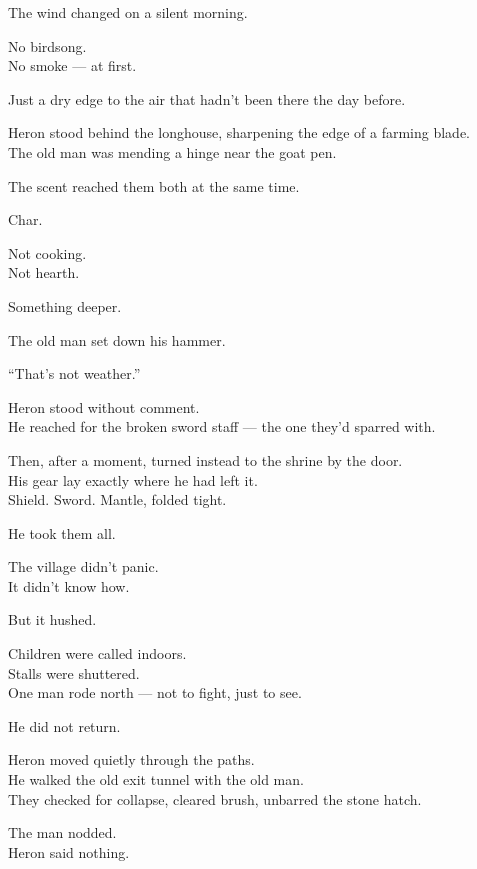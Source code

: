 \documentclass[12pt]{article}
\begin{document}
The wind changed on a silent morning.

No birdsong.\\
No smoke — at first.

Just a dry edge to the air that hadn’t been there the day before.

Heron stood behind the longhouse, sharpening the edge of a farming blade.\\
The old man was mending a hinge near the goat pen.

The scent reached them both at the same time.

Char.

Not cooking.\\
Not hearth.

Something deeper.

\vspace{1em}

The old man set down his hammer.

“That’s not weather.”

Heron stood without comment.\\
He reached for the broken sword staff — the one they’d sparred with.

Then, after a moment, turned instead to the shrine by the door.\\
His gear lay exactly where he had left it.\\
Shield. Sword. Mantle, folded tight.

He took them all.

\vspace{1em}

The village didn’t panic.\\
It didn’t know how.

But it hushed.

Children were called indoors.\\
Stalls were shuttered.\\
One man rode north — not to fight, just to see.

He did not return.

\vspace{1em}

Heron moved quietly through the paths.\\
He walked the old exit tunnel with the old man.\\
They checked for collapse, cleared brush, unbarred the stone hatch.

The man nodded.\\
Heron said nothing.
\end{document}
